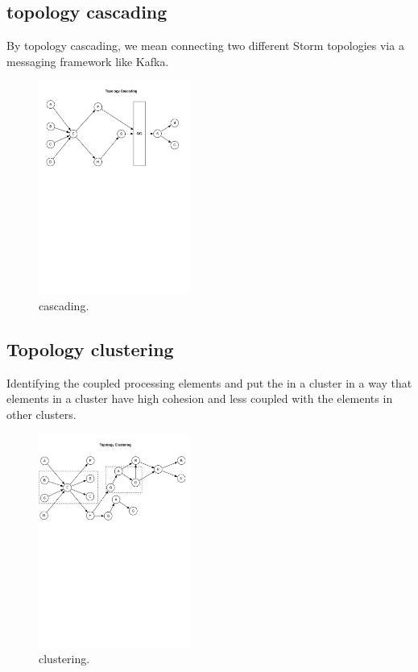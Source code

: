 \subsection{topology cascading}

By topology cascading, we mean connecting two different Storm topologies via a messaging framework like Kafka.

\begin{figure}[h!]
	\begin{center}
		\includegraphics[width=5cm]{images/cascading}
		\caption{cascading.}
		\label{fig:cascading}
	\end{center}
\end{figure}

\subsection{Topology clustering}
Identifying the coupled processing elements and put the in a cluster in a way that elements in a cluster have high cohesion and less coupled with the elements in other clusters.

\begin{figure}[h!]
	\begin{center}
		\includegraphics[width=5cm]{images/clustering}
		\caption{clustering.}
		\label{fig:clustering}
	\end{center}
\end{figure}

